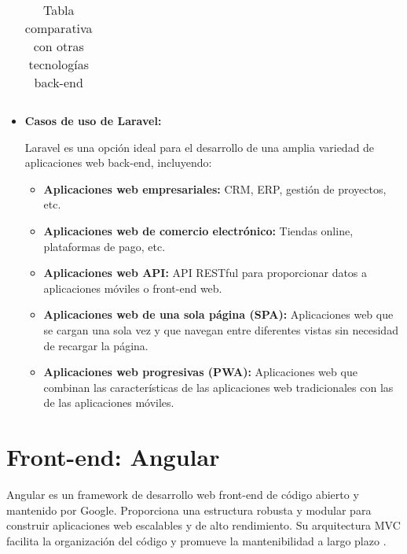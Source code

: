 \begin{itemize}
\begin{longtable}[h]{ p{} | p{} | p{} | p{} |}
    \caption{Tabla comparativa con otras tecnologías back-end}
    \label{tab:otras-soluciones}
    \end{longtable}
    
     \item \textbf{Casos de uso de Laravel:}

    Laravel es una opción ideal para el desarrollo de una amplia variedad de aplicaciones web back-end, incluyendo:
    
     \begin{itemize}

    \item \textbf{Aplicaciones web empresariales:} CRM, ERP, gestión de proyectos, etc.

    \item \textbf{Aplicaciones web de comercio electrónico:} Tiendas online, plataformas de pago, etc.

    \item \textbf{Aplicaciones web API:} API RESTful para proporcionar datos a aplicaciones móviles o front-end web.

    \item \textbf{Aplicaciones web de una sola página (SPA):} Aplicaciones web que se cargan una sola vez y que navegan entre diferentes vistas sin necesidad de recargar la página.

    \item \textbf{Aplicaciones web progresivas (PWA):} Aplicaciones web que combinan las características de las aplicaciones web tradicionales con las de las aplicaciones móviles.
    
    \end{itemize}
\end{itemize}
\section{Front-end: Angular}\label{sec:sec3.3}

Angular es un framework de desarrollo web front-end de código abierto y mantenido por Google. Proporciona una estructura robusta y modular para construir aplicaciones web escalables y de alto rendimiento. Su arquitectura MVC facilita la organización del código y promueve la mantenibilidad a largo plazo \cite{angular, angular_development}.

\vspace{0.5cm}

